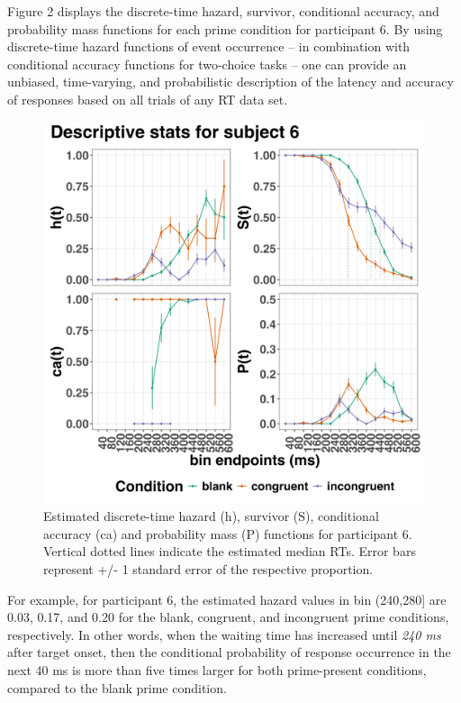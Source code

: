 \documentclass[
  man, donotrepeattitle,floatsintext]{apa6}
\begin{document}
Figure 2 displays the discrete-time hazard, survivor, conditional accuracy, and probability mass functions for each prime condition for participant 6. By using discrete-time hazard functions of event occurrence -- in combination with conditional accuracy functions for two-choice tasks -- one can provide an unbiased, time-varying, and probabilistic description of the latency and accuracy of responses based on all trials of any RT data set.



\begin{figure}[H]

{\centering \includegraphics[width=0.9\linewidth,height=0.67\textheight,]{../Tutorial_1_descriptive_stats/figures/Plot_for_subject6_PanisSchmidt} 

}

\caption{Estimated discrete-time hazard (h), survivor (S), conditional accuracy (ca) and probability mass (P) functions for participant 6. Vertical dotted lines indicate the estimated median RTs. Error bars represent +/- 1 standard error of the respective proportion.}\label{fig:eha-plot}
\end{figure}

For example, for participant 6, the estimated hazard values in bin (240,280{]} are 0.03, 0.17, and 0.20 for the blank, congruent, and incongruent prime conditions, respectively. In other words, when the waiting time has increased until \emph{240 ms} after target onset, then the conditional probability of response occurrence in the next 40 ms is more than five times larger for both prime-present conditions, compared to the blank prime condition.
\end{document}
